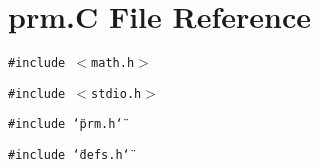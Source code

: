 \section{prm.C File Reference}
\label{prm_C}
{\tt \#include $<$math.h$>$}\par
{\tt \#include $<$stdio.h$>$}\par
{\tt \#include \char`\"{}prm.h\char`\"{}}\par
{\tt \#include \char`\"{}defs.h\char`\"{}}\par
